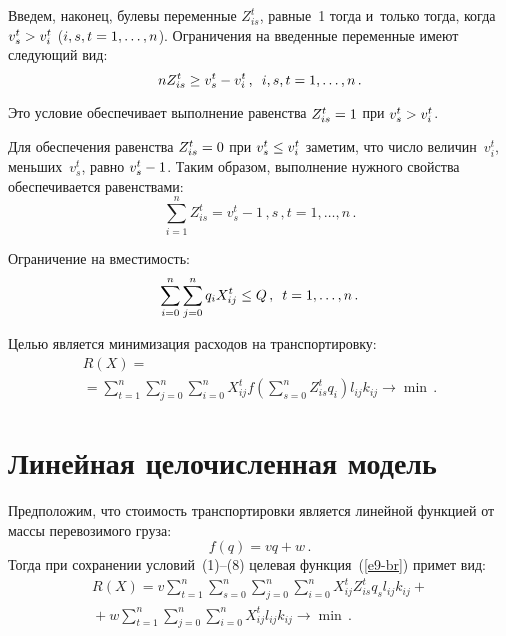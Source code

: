 \begin{multicols}{2}
  Введем, наконец, булевы переменные $Z^t_{is}$, равные~1 тогда и~только
тогда, когда $v_s^t\hm>v_i^t$ ($i,s,t\hm=1,\ldots ,n$). Ограничения на введенные
переменные имеют следующий вид:
  \begin{equation}
  nZ_{is}^t \geq v_s^t -v_i^t\,,\enskip i,s,t=1,\ldots, n\,.
  \label{e6-br}
  \end{equation}


  Это условие обеспечивает выполнение равенства $Z_{is}^t\hm= 1$ при
$v_s^t\hm>v_i^t$.

  Для обеспечения равенства $Z_{is}^t\hm=0$ при $v_s^t\hm\leq v_i^t$
заметим, что число величин~$v_i^t$, меньших~$v_s^t$, равно $v_s^t\hm-1$.
Таким образом, выполнение нужного свойства обеспечивается равенствами:
  \begin{equation}
  \sum\limits_{i=1}^n Z_{is}^t =v_s^t -1\,, s\,,t=1,\ldots, n\,.
  \label{e7-br}
  \end{equation}

     Ограничение на вместимость:
     \begin{equation}
     \sum\limits_{i=0}^n \sum\limits_{j=0}^n q_i X_{ij}^t \leq Q\,,\enskip
t=1,\ldots, n\,.
     \label{e8-br}
     \end{equation}

  Целью является минимизация расходов на транспортировку:
  \begin{multline}
  R(X) = {}\\
  {}=\sum\limits_{t=1}^n \sum\limits_{j=0}^n \sum\limits_{i=0}^n X_{ij}^t f
\left ( \sum\limits_{s=0}^n Z^t_{is} q_i\right) l_{ij} k_{ij} \to \min\,.
  \label{e9-br}
  \end{multline}

\section{Линейная целочисленная модель}

  Предположим, что стоимость транспортировки является линейной функцией
от массы перевозимого груза:
$$
f(q)=vq+w\,.
$$
%
 Тогда при сохранении
условий~(1)--(8) целевая функция~(\ref{e9-br}) примет вид:
  \begin{multline}
  R(X) =v \sum\limits_{t=1}^n \sum\limits_{s=0}^n \sum\limits_{j=0}^n
\sum\limits_{i=0}^n X_{ij}^t Z_{is}^t q_s l_{ij} k_{ij} +{}\\
 {}+w \sum\limits_{t=1}^n
\sum\limits_{j=0}^n \sum\limits_{i=0}^n X_{ij}^t l_{ij} k_{ij} \to \min\,.
  \label{e10-br}
  \end{multline}


\end{multicols}
